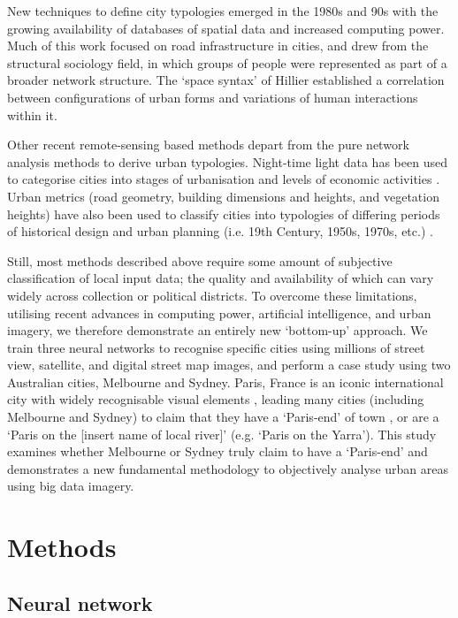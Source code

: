 \documentclass[Crown,sageh,times]{sagej}
\begin{document}
New techniques to define city typologies emerged in the 1980s and 90s with the growing availability of databases of spatial data and increased computing power. Much of this work focused on road infrastructure in cities, and drew from the structural sociology field, in which groups of people were represented as part of a broader network structure. The `space syntax' of Hillier \cite{Hillier1996} established a correlation between configurations of urban forms and variations of human interactions within it. 

Other recent remote-sensing based methods depart from the pure network analysis methods to derive urban typologies. Night-time light data has been used to categorise cities into stages of urbanisation and levels of economic activities \cite{Zhang2013}. Urban metrics (road geometry, building dimensions and heights, and vegetation heights) have also been used to classify cities into typologies of differing periods of historical design and urban planning (i.e. 19th Century, 1950s, 1970s, etc.) \cite{Hermosilla2014}.

Still, most methods described above require some amount of subjective classification of local input data; the quality and availability of which can vary widely across collection or political districts. To overcome these limitations, utilising recent advances in computing power, artificial intelligence, and urban imagery, we therefore demonstrate an entirely new `bottom-up' approach. We train three neural networks to recognise specific cities using millions of street view, satellite, and digital street map images, and perform a case study using two Australian cities, Melbourne and Sydney. Paris, France is an iconic international city \cite{Anholt2006} with widely recognisable visual elements \cite{Doersch2012}, leading many cities (including Melbourne and Sydney) to claim that they have a `Paris-end' of town \cite{Williams2010}, or are a `Paris on the [insert name of local river]' \cite{Wilden2013} (e.g. `Paris on the Yarra'). This study examines whether Melbourne or Sydney truly claim to have a `Paris-end' and demonstrates a new fundamental methodology to objectively analyse urban areas using big data imagery.

\section{Methods}\label{sec:methods}
\subsection{Neural network}\label{sec:methods1}
\end{document}
